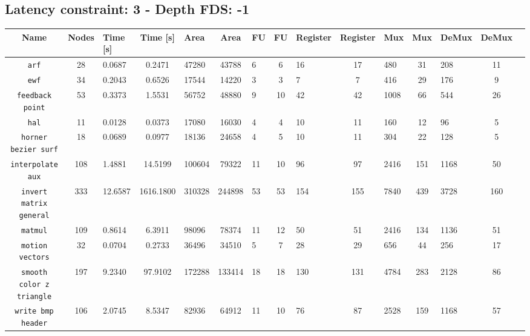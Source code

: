 \documentclass[a4paper, 11pt, oneside]{article}
\begin{document}
\begin{landscape}
\clearpage
\subsection{Latency constraint: 3 - Depth FDS: -1}
\begin{table}[!h]
  \begin{center}
    \begin{tabular}{|c|c V{3} c|g|c|g|c|g|c|g|c|g|c|g|}
    \hline
    \textbf{Name} & \textbf{Nodes} & \textbf{Time [s]} & \textbf{Time [s]} & \textbf{Area} & \textbf{Area} & \textbf{FU} & \textbf{FU} & \textbf{Register} & \textbf{Register} & \textbf{Mux} & \textbf{Mux}
    & \textbf{DeMux} & \textbf{DeMux}\\
    \hline
    \texttt{arf}										  &  28 &  0.0687 &    0.2471 &  47280 &  43788 &  6 &  6 &  16 &  17 &  480 &  31 &  208 &  11 \\ \hline
    \texttt{ewf}										  &  34 &  0.2043 &    0.6526 &  17544 &  14220 &  3 &  3 &   7 &   7 &  416 &  29 &  176 &   9 \\ \hline
    \texttt{feedback point}					  &  53 &  0.3373 &    1.5531 &  56752 &  48880 &  9 & 10 &  42 &  42 & 1008 &  66 &  544 &  26 \\ \hline
    \texttt{hal}										  &  11 &  0.0128 &    0.0373 &  17080 &  16030 &  4 &  4 &  10 &  11 &  160 &  12 &   96 &   5 \\ \hline
    \texttt{horner bezier surf}			  &  18 &  0.0689 &    0.0977 &  18136 &  24658 &  4 &  5 &  10 &  11 &  304 &  22 &  128 &   5 \\ \hline
    \texttt{interpolate aux}				  & 108 &  1.4881 &   14.5199 & 100604 &  79322 & 11 & 10 &  96 &  97 & 2416 & 151 & 1168 &  50 \\ \hline
    \texttt{invert matrix general}	  & 333 & 12.6587 & 1616.1800 & 310328 & 244898 & 53 & 53 & 154 & 155 & 7840 & 439 & 3728 & 160 \\ \hline
    \texttt{matmul}									  & 109 &  0.8614 &    6.3911 &  98096 &  78374 & 11 & 12 &  50 &  51 & 2416 & 134 & 1136 &  51 \\ \hline
    \texttt{motion vectors}					  &  32 &  0.0704 &    0.2733 &  36496 &  34510 &  5 &  7 &  28 &  29 &  656 &  44 &  256 &  17 \\ \hline
    \texttt{smooth color z triangle}	& 197 &  9.2340 &   97.9102 & 172288 & 133414 & 18 & 18 & 130 & 131 & 4784 & 283 & 2128 &  86 \\ \hline
    \texttt{write bmp header}				  & 106 &  2.0745 &    8.5347 &  82936 &  64912 & 11 & 10 &  76 &  87 & 2528 & 159 & 1168 &  57 \\ \hline
  \end{tabular}
  \end{center}
\end{table}
\end{landscape}

\end{document}
